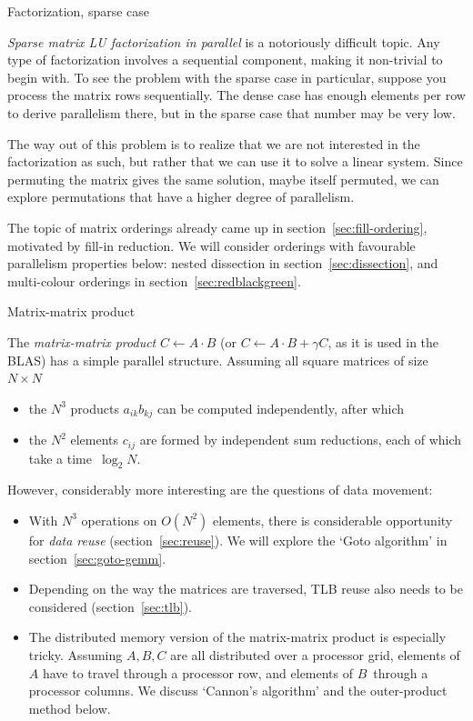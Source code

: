 

 {Factorization, sparse case}

\emph{Sparse matrix LU factorization in parallel} is a notoriously
difficult topic. Any type of factorization involves a sequential
component, making it non-trivial to begin with. To see the problem
with the sparse case in particular, suppose you process
the matrix rows sequentially. The dense case has enough elements per
row to derive parallelism there, but in the sparse case that number
may be very low.

The way out of this problem is to realize that we are not interested
in the factorization as such, but rather that we can use it to solve a
linear system. Since permuting the matrix gives the same solution,
maybe itself permuted, we can explore permutations that have a higher
degree of parallelism.

The topic of matrix orderings already came up in
section~\ref{sec:fill-ordering}, motivated by fill-in reduction.
We will consider orderings with favourable parallelism properties
below: nested dissection in section~\ref{sec:dissection}, and
multi-colour orderings in section~\ref{sec:redblackgreen}.


{} {Matrix-matrix product}

The \emph{matrix-matrix product} $C\leftarrow A\cdot B$
%
(or $C\leftarrow A\cdot B+\gamma C$, as it is used in the \ac{BLAS}) 
%
has a simple parallel structure. Assuming all square matrices of size
$N\times N$
\begin{itemize}
\item  the $N^3$ products $a_{ik}b_{kj}$ can be computed independently,
  after which
\item the $N^2$ elements $c_{ij}$ are formed by independent sum
  reductions, each of which take a time~$\log_2 N$. 
\end{itemize}
However, considerably more interesting are the questions of data
movement:
\begin{itemize}
\item With $N^3$ operations on $O(N^2)$ elements, there is
  considerable opportunity for
  \emph{data reuse}%
  (section~\ref{sec:reuse}). We will explore the `Goto algorithm' in
  section~\ref{sec:goto-gemm}.
\item Depending on the way the matrices are traversed, \ac{TLB} reuse
  also needs to be considered (section~\ref{sec:tlb}).
\item The distributed memory version of the matrix-matrix product is
  especially tricky. Assuming $A,B,C$ are all distributed over a
  processor grid, elements of $A$ have to travel through a processor
  row, and elements of $B$~through a processor columns. We discuss 
  `Cannon's algorithm' and the outer-product method below.
\end{itemize}

